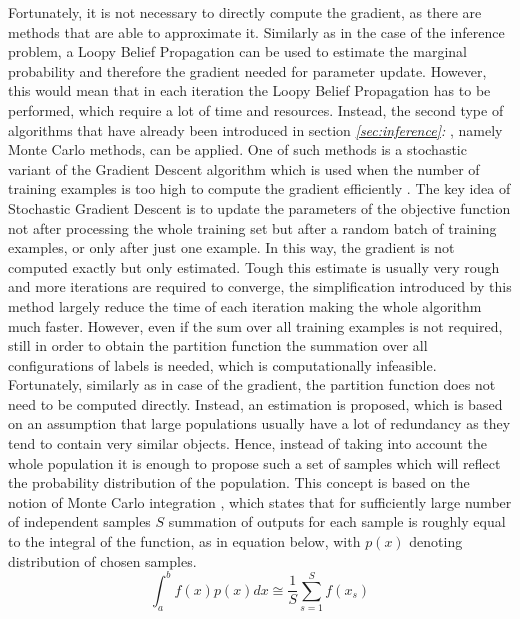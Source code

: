Fortunately, it is not necessary to directly compute the gradient, as there are methods that are able to approximate it. Similarly as in the case of the inference problem, a Loopy Belief Propagation can be used to estimate the marginal probability and therefore the gradient needed for parameter update. However, this would mean that in each iteration the Loopy Belief Propagation has to be performed, which require a lot of time and resources. Instead, the second type of algorithms that have already been introduced in section \textit{\ref{sec:inference}: }, namely Monte Carlo methods, can be applied. One of such methods is a stochastic variant of the Gradient Descent algorithm which is used when the number of training examples is too high to compute the gradient efficiently \cite{optimisation_curtis}. The key idea of Stochastic Gradient Descent is to update the parameters of the objective function not after processing the whole training set but after a random batch of training examples, or only after just one example. In this way, the gradient is not computed exactly but only estimated. Tough this estimate is usually very rough and more iterations are required to converge, the simplification introduced by this method largely reduce the time of each iteration making the whole algorithm much faster. However, even if the sum over all training examples is not required, still in order to obtain the partition function the summation over all configurations of labels is needed, which is computationally infeasible. Fortunately, similarly as in case of the gradient, the partition function does not need to be computed directly. Instead, an estimation is proposed, which is based on an assumption that large populations usually have a lot of redundancy as they tend to contain very similar objects. Hence, instead of taking into account the whole population it is enough to propose such a set of samples which will reflect the probability distribution of the population. This concept is based on the notion of Monte Carlo integration \cite{bayesian_statistics}, which states that for sufficiently large number of independent samples $S$ summation of outputs for each sample is roughly equal to the integral of the function, as in equation below, with $p(x)$ denoting distribution of chosen samples.
\begin{equation}
    \int_{a}^{b}{f(x)p(x)dx} \cong \frac{1}{S}\sum_{s=1}^{S}{f(x_s)}
\end{equation}
